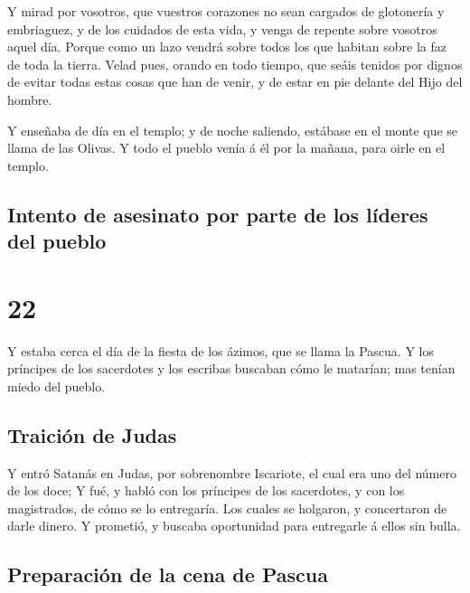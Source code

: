  Y mirad por vosotros, que vuestros corazones no sean
cargados de glotonería y embriaguez, y de los cuidados de esta vida, y
venga de repente sobre vosotros aquel día.  Porque como
un lazo vendrá sobre todos los que habitan sobre la faz de toda la
tierra.  Velad pues, orando en todo tiempo, que seáis
tenidos por dignos de evitar todas estas cosas que han de venir, y de
estar en pie delante del Hijo del hombre.

 Y enseñaba de día en el templo; y de noche saliendo,
estábase en el monte que se llama de las Olivas.  Y todo
el pueblo venía á él por la mañana, para oirle en el templo.

\hypertarget{intento-de-asesinato-por-parte-de-los-luxedderes-del-pueblo}{%
\subsection{Intento de asesinato por parte de los líderes del
pueblo}\label{intento-de-asesinato-por-parte-de-los-luxedderes-del-pueblo}}

\hypertarget{section-21}{%
\section{22}\label{section-21}}

 Y estaba cerca el día de la fiesta de los ázimos, que se
llama la Pascua.  Y los príncipes de los sacerdotes y los
escribas buscaban cómo le matarían; mas tenían miedo del pueblo.

\hypertarget{traiciuxf3n-de-judas}{%
\subsection{Traición de Judas}\label{traiciuxf3n-de-judas}}

 Y entró Satanás en Judas, por sobrenombre Iscariote, el
cual era uno del número de los doce;  Y fué, y habló con
los príncipes de los sacerdotes, y con los magistrados, de cómo se lo
entregaría.  Los cuales se holgaron, y concertaron de
darle dinero.  Y prometió, y buscaba oportunidad para
entregarle á ellos sin bulla.

\hypertarget{preparaciuxf3n-de-la-cena-de-pascua}{%
\subsection{Preparación de la cena de
Pascua}\label{preparaciuxf3n-de-la-cena-de-pascua}}

